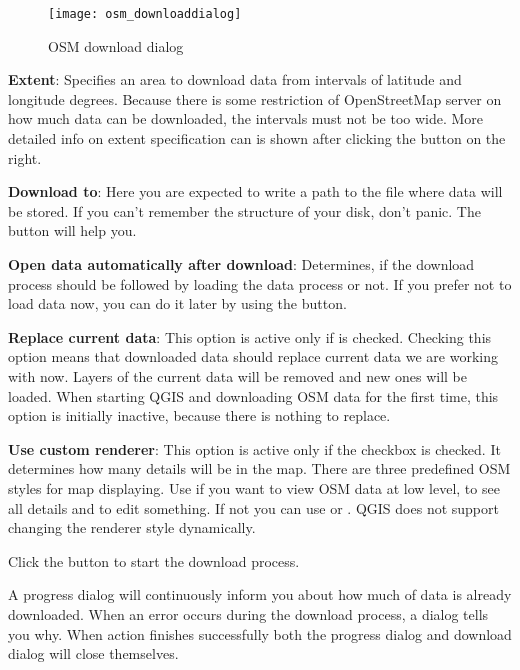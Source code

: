 \begin{figure}[ht]
   \centering
   \texttt{[image: osm\_downloaddialog]}
   \caption{OSM download dialog \nixcaption}\label{fig:osmdownload}
\end{figure}

\begin{description}
\item \textbf{Extent}: Specifies an area to download data from intervals
of latitude and longitude degrees. Because there is some restriction of
OpenStreetMap server on how much data can be downloaded, the intervals
must not be too wide. More detailed info on extent specification can is
shown after clicking the  button on
the right.
\item \textbf{Download to}: Here you are expected to write a path to the
file where data will be stored. If you can't remember the structure of
your disk, don't panic. The  button will help you.
\item \textbf{Open data automatically after download}: Determines, if the
download process should be followed by loading the data process or not. If you
prefer not to load data now, you can do it later by using
the  button.
\item \textbf{Replace current data}: This option is active only if
 is checked.
Checking this option means that downloaded data should replace
current data we are working with now. Layers of the current data will be
removed and new ones will be loaded. When starting QGIS and downloading
OSM data for the first time, this option is initially inactive, because
there is nothing to replace.
\item \textbf{Use custom renderer}: This option is active only if the
 checkbox is checked.
It determines how many details will be in the map. There are three predefined
OSM styles for map displaying. Use  if you want to view
OSM data at low level, to see all details and to edit something. If not you
can use  or . QGIS \CURRENT does
not support changing the renderer style dynamically.
\end{description}

Click the  button to start the download process.

A progress dialog will continuously inform you about how much of data is
already downloaded. When an error occurs during the download process, a
dialog tells you why. When action finishes successfully both the progress dialog
and download dialog will close themselves.

